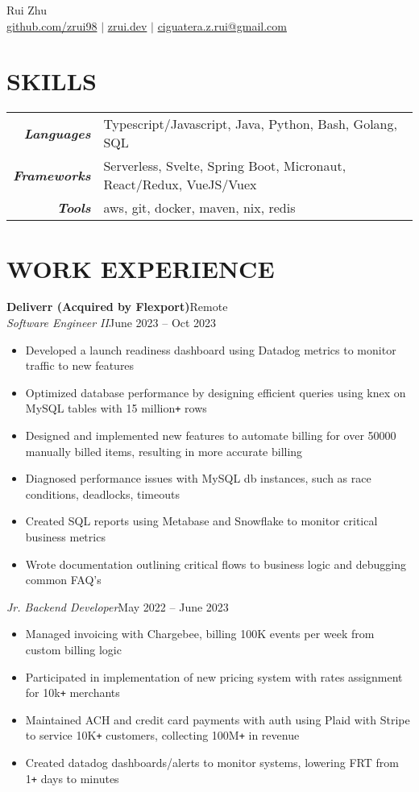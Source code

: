 \documentclass[letterpaper]{article}
\newcommand{\Header}[2]{\begin{center}
	\huge\usefont{OT1}{lmss}{m}{n}
		#1 \\
	\small{#2}
\end{center}}
\newcommand{\SplitEntry}[2]{\textbf{\textit{#1}} & \small{#2}\\}
\newcommand{\NewPart}[1]{\section*{\large\uppercase{\textbf{#1}}}}
\newcommand{\JobEntry}[3]{
	\normalsize\textbf{#1}\hfill\normalsize{#2}\\
	#3\vspace{0.1cm}
}
\newcommand{\DatedEntry}[3]{
	\small\textit{#1}\hfill\small{#2}\\
	\vspace{0.1cm}#3\vspace{0.1cm}
}
\begin{document}
\Header{Rui Zhu}{\href{https://github.com/zrui98}{github.com/zrui98} $|$ \href{https://zrui.dev}{zrui.dev} $|$ \href{mailto:ciguatera.z.rui@gmail.ca}{ciguatera.z.rui@gmail.com}}\vspace{-0.5cm}

\NewPart{Skills}
\begin{tabular}{r|l}
	\SplitEntry{Languages}{Typescript/Javascript, Java, Python, Bash, Golang, SQL}
	\SplitEntry{Frameworks}{Serverless, Svelte, Spring Boot, Micronaut, React/Redux, VueJS/Vuex}
	\SplitEntry{Tools}{aws, git, docker, maven, nix, redis}
\end{tabular}\vspace{-0.2cm}

\NewPart{Work Experience}
\JobEntry{Deliverr (Acquired by Flexport)}
{Remote}
{
	\DatedEntry{Software Engineer II}
	{June 2023 -- Oct 2023}
	{
		\begin{itemize}[nolistsep]
			\item Developed a launch readiness dashboard using Datadog metrics to monitor traffic to new features
			\item Optimized database performance by designing efficient queries using knex on MySQL tables with 15 million\texttt{+} rows
			\item Designed and implemented new features to automate billing for over 50000 manually billed items, resulting in more accurate billing
			\item Diagnosed performance issues with MySQL db instances, such as race conditions, deadlocks, timeouts
			\item Created SQL reports using Metabase and Snowflake to monitor critical business metrics
			\item Wrote documentation outlining critical flows to business logic and debugging common FAQ's
		\end{itemize}
	}
	\DatedEntry{Jr. Backend Developer}
	{May 2022 -- June 2023}
	{
		\begin{itemize}[nolistsep]
			\item Managed invoicing with Chargebee, billing 100K events per week from custom billing logic
			\item Participated in implementation of new pricing system with rates assignment for 10k\texttt{+} merchants
			\item Maintained ACH and credit card payments with auth using Plaid with Stripe to service 10K\texttt{+} customers, collecting 100M\texttt{+} in revenue
			\item Created datadog dashboards/alerts to monitor systems, lowering FRT from 1\texttt{+} days to minutes

\end{itemize}}}
\end{document}
